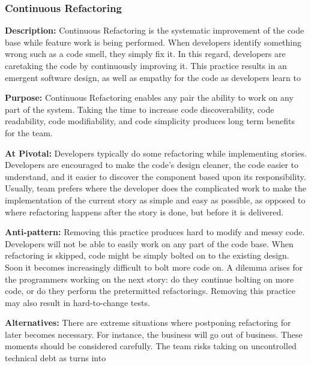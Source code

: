 \begin{table}[]
\subsubsection{Continuous Refactoring}
\textbf{Description:} Continuous Refactoring is the systematic improvement of the code base while feature work is being performed. When developers identify something wrong such as a code smell, they simply fix it. In this regard, developers are caretaking the code by continuously improving it. This practice results in an emergent software design, as well as empathy for the code as developers learn to  


\textbf{Purpose:} Continuous Refactoring enables any pair the ability to work on any part of the system. Taking the time to increase code discoverability, code readability, code modifiability, and code simplicity produces long term benefits for the team. 

\textbf{At Pivotal:} Developers typically do some refactoring while implementing stories. Developers are encouraged to make the code's design cleaner, the code easier to understand, and it easier to discover the component based upon its responsibility. Usually, team prefers  where the developer does the complicated work to make the implementation of the current story as simple and easy as possible, as opposed to  where refactoring happens after the story is done, but before it is delivered.  

\textbf{Anti-pattern:} Removing this practice produces hard to modify and messy code. Developers will not be able to easily work on any part of the code base. When refactoring is skipped, code might be simply bolted on to the existing design. Soon it becomes increasingly difficult to bolt more code on. A dilemma arises for the programmers working on the next story: do they continue bolting on more code, or do they perform the pretermitted refactorings. Removing this practice may also result in hard-to-change tests.

\textbf{Alternatives:} There are extreme situations where postponing refactoring for later becomes necessary. For instance, the business will go out of business. These moments should be considered carefully. The team risks taking on uncontrolled technical debt as  turns into  


\end{table}

